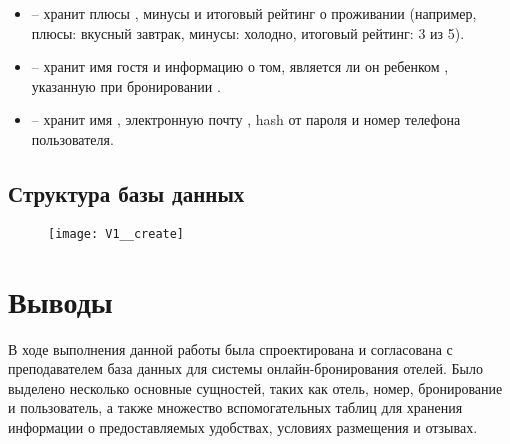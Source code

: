 \begin{itemize}
	\item {} -- хранит плюсы , минусы  и итоговый рейтинг  о проживании  (например, плюсы: вкусный завтрак, минусы: холодно, итоговый рейтинг: 3 из 5).
	
	\item {} -- хранит имя гостя  и информацию о том, является ли он ребенком , указанную при бронировании .
	
	\item {} -- хранит имя , электронную почту , hash от пароля  и номер телефона  пользователя.
\end{itemize}

\subsection{Структура базы данных}

\begin{figure}[H]
	\centering
	\texttt{[image: V1\_\_create]}
\end{figure}

\section{Выводы}

В ходе выполнения данной работы была спроектирована и согласована с преподавателем база данных для системы онлайн-бронирования отелей. Было выделено несколько основные сущностей, таких как отель, номер, бронирование и пользователь, а также множество вспомогательных таблиц для хранения информации о предоставляемых удобствах, условиях размещения и отзывах.


